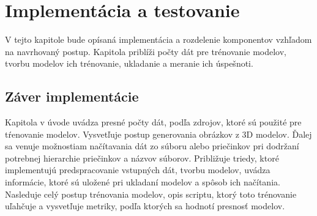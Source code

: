 
\chapter{Implementácia a testovanie}

V tejto kapitole bude opísaná implementácia a rozdelenie komponentov vzhľadom na navrhovaný postup.
Kapitola priblíži počty dát pre trénovanie modelov, tvorbu modelov ich trénovanie, ukladanie a meranie ich úspešnoti.









\section{Záver implementácie}

Kapitola v úvode uvádza presné počty dát, podľa zdrojov, ktoré sú použité pre tŕenovanie modelov.
Vysvetľuje postup generovania obrázkov z 3D modelov.
Ďalej sa venuje možnostiam načítavania dát zo súboru alebo priečinkov pri dodržaní potrebnej hierarchie priečinkov a názvov súborov.
Približuje triedy, ktoré implementujú predspracovanie vstupných dát, tvorbu modelov, uvádza informácie, ktoré sú uložené
    pri ukladaní modelov a spôsob ich načítania.
Nasleduje celý postup trénovania modelov, opis scriptu, ktorý toto trénovanie uľahčuje a vysvetľuje metriky, podľa ktorých sa hodnotí presnosť modelov.
